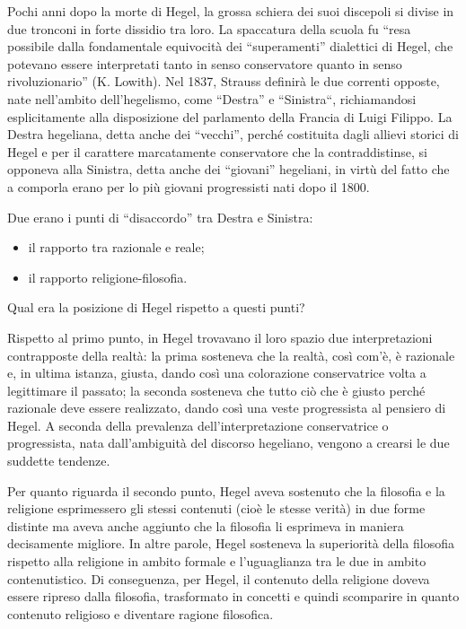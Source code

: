 \documentclass[a4paper,12pt,oneside,openany]{book}%
\begin{document}
Pochi anni dopo la morte di Hegel, la grossa schiera dei suoi discepoli si divise in due tronconi in forte dissidio tra loro. La spaccatura della scuola fu “resa possibile dalla fondamentale equivocità dei “superamenti” dialettici di Hegel, che potevano essere interpretati tanto in senso conservatore quanto in senso rivoluzionario” (K. Lowith). Nel 1837, Strauss definirà le due correnti opposte, nate nell’ambito dell’hegelismo, come “Destra” e “Sinistra“, richiamandosi esplicitamente alla disposizione del parlamento della Francia di Luigi Filippo. La Destra hegeliana, detta anche dei “vecchi”, perché costituita dagli allievi storici di Hegel e per il carattere marcatamente conservatore che la contraddistinse, si opponeva alla Sinistra, detta anche dei “giovani” hegeliani, in virtù del fatto che a comporla erano per lo più giovani progressisti nati dopo il 1800.

Due erano i punti di “disaccordo” tra Destra e Sinistra:

\begin{itemize}
	\item il rapporto tra razionale e reale;
	\item  il rapporto religione-filosofia.
\end{itemize}	
	
Qual era la posizione di Hegel rispetto a questi punti?

Rispetto al primo punto, in Hegel trovavano il loro spazio due interpretazioni contrapposte della realtà: la prima sosteneva che la realtà, così com’è, è razionale e, in ultima istanza, giusta, dando così una colorazione conservatrice volta a legittimare il passato; la seconda sosteneva che tutto ciò che è giusto perché razionale deve essere realizzato, dando così una veste progressista al pensiero di Hegel. A seconda della prevalenza dell’interpretazione conservatrice o progressista, nata dall’ambiguità del discorso hegeliano, vengono a crearsi le due suddette tendenze.

Per quanto riguarda il secondo punto, Hegel aveva sostenuto che la filosofia e la religione esprimessero gli stessi contenuti (cioè le stesse verità) in due forme distinte ma aveva anche aggiunto che la filosofia li esprimeva in maniera decisamente migliore. In altre parole, Hegel sosteneva la superiorità della filosofia rispetto alla religione in ambito formale e l’uguaglianza tra le due in ambito contenutistico. Di conseguenza, per Hegel, il contenuto della religione doveva essere ripreso dalla filosofia, trasformato in concetti e quindi scomparire in quanto contenuto religioso e  diventare ragione filosofica.
\end{document}
